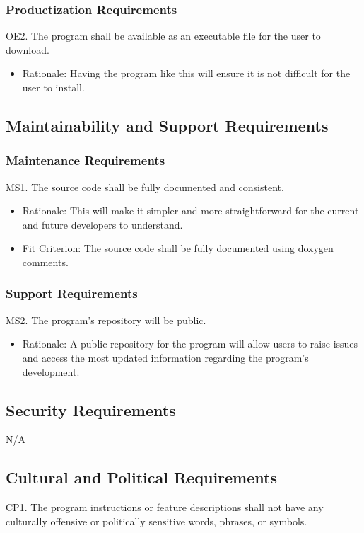 \documentclass[12pt, titlepage]{article}
\begin{document}
\subsubsection{Productization Requirements}
OE2. The program shall be available as an executable file for the user to download.
\begin{itemize}
    \item Rationale: Having the program like this will ensure it is not difficult for the user to install.
\end{itemize}

\subsection{Maintainability and Support Requirements}
\subsubsection{Maintenance Requirements}
MS1. The source code shall be fully documented and consistent.
\begin{itemize}
    \item Rationale: This will make it simpler and more straightforward for the current and future developers to understand.
    \item \color{red} Fit Criterion: The source code shall be fully documented using doxygen comments. \color{black}
\end{itemize}
\subsubsection{Support Requirements}
MS2. The program's repository will be public.
\begin{itemize}
    \item Rationale: A public repository for the program will allow users to raise issues and access the most updated information regarding the program's development.
\end{itemize}

\subsection{Security Requirements}
N/A
\subsection{Cultural and Political Requirements}
CP1. The program instructions or feature descriptions shall not have any culturally offensive or politically sensitive words, phrases, or symbols.
\end{document}
